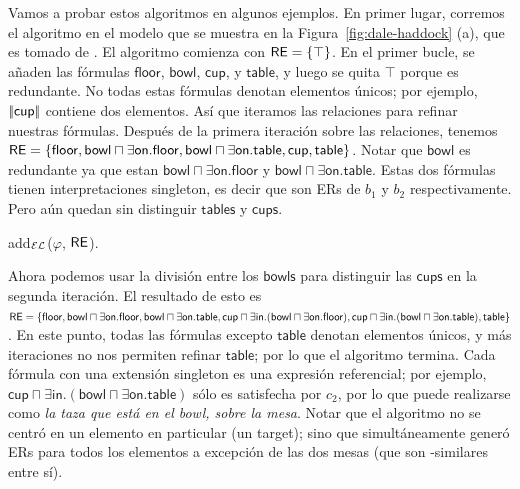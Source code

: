 Vamos a probar estos algoritmos en algunos ejemplos. En primer lugar, corremos el \el algoritmo en el modelo que se muestra en la Figura~\ref{fig:dale-haddock} (a), que es
tomado de \cite{dale91:gener}. El
algoritmo comienza con $ \textsf{RE} = \{\top \} $. En el primer bucle, se a\~naden
las f\'ormulas $\mathsf{floor}$, $\mathsf{bowl}$, $\mathsf{cup}$, y
$\mathsf{table}$, y luego se quita $\top$ porque es redundante.
No todas estas f\'ormulas denotan elementos \'unicos; por ejemplo,
$|\!|\mathsf{cup}|\!|$ contiene dos elementos. As\'i que iteramos
las relaciones para refinar nuestras f\'ormulas. Despu\'es de la primera iteraci\'on sobre
las relaciones, tenemos  $\textsf{RE} = \{ \mathsf{floor}, \mathsf{bowl} \sqcap
\exists \mathsf{on}.\mathsf{floor}, \mathsf{bowl} \sqcap \exists
\mathsf{on}.\mathsf{table}, \mathsf{cup}, \mathsf{table} \}$. Notar que
$\mathsf{bowl}$ es redundante ya que estan $\mathsf{bowl} \sqcap
\exists \mathsf{on}.\mathsf{floor}$ y $\mathsf{bowl} \sqcap \exists
\mathsf{on}.\mathsf{table}$. Estas dos f\'ormulas tienen interpretaciones singleton, es decir que son ERs de $b_1$ y $b_2$ respectivamente. Pero a\'un quedan sin distinguir $\mathsf{tables}$ y $\mathsf{cups}$.

%
\begin{megaalgorithm}[t]%
\dontprintsemicolon
\caption{add$_\mathcal{EL}$($\varphi$, $\textsf{RE}$).}
\label{algo:bisim-add-el}
\end{megaalgorithm}
Ahora podemos usar la divisi\'on entre los $\mathsf{bowls}$ para distinguir las $\mathsf{cups}$ en
la segunda iteraci\'on. El resultado de esto es $\textsf{RE} = \{ \mathsf{floor},
\mathsf{bowl} \sqcap \exists \mathsf{on}.\mathsf{floor}, \mathsf{bowl}
\sqcap \exists \mathsf{on}.\mathsf{table}, \mathsf{cup} \sqcap \exists
\mathsf{in}. (\mathsf{bowl} \sqcap \exists
\mathsf{on}.\mathsf{floor}), \mathsf{cup} \sqcap \exists
\mathsf{in}. (\mathsf{bowl} \sqcap \exists
\mathsf{on}.\mathsf{table}), \mathsf{table} \}$. En este punto, todas las
f\'ormulas excepto $ \mathsf{table} $ denotan elementos \'unicos, y m\'as
iteraciones no nos permiten refinar $ \mathsf {table} $; por lo que el algoritmo
termina. Cada f\'ormula con una extensi\'on singleton es una expresi\'on referencial; por ejemplo, $\mathsf{cup} \sqcap \exists
\mathsf{in}. (\mathsf{bowl} \sqcap \exists \mathsf{on}.\mathsf{table})$ s\'olo es satisfecha por $ c_2 $, por lo que puede
realizarse como \textit{la taza que est\'a en el bowl, sobre la mesa}. Notar que
el algoritmo no se centr\'o en un elemento en particular (un target); sino que 
simult\'aneamente gener\'o ERs para todos los elementos a excepci\'on de las dos
mesas (que son \EL-similares entre s\'i).


